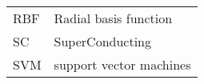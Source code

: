\begin{table}[ht]
\begin{tabular}{ll}
RBF & Radial basis function\\
SC & SuperConducting\\
SVM & support vector machines\\
\end{tabular}
\end{table}




